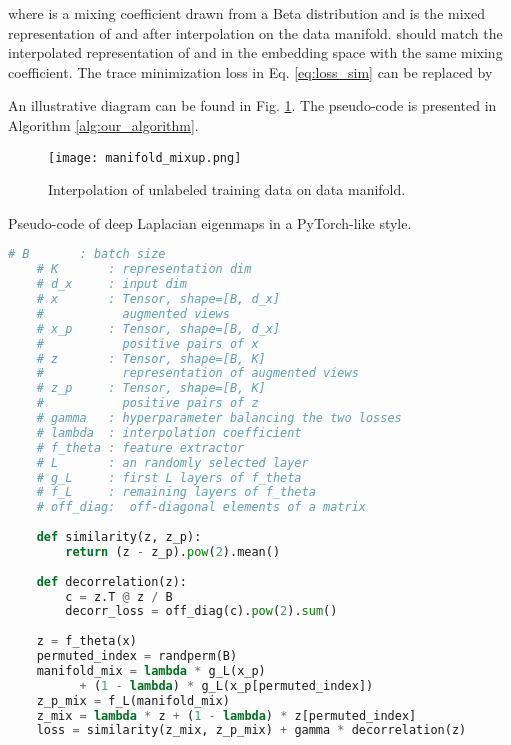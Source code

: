\documentclass{article}
\begin{document}
where  is a mixing coefficient drawn from a Beta distribution and  is the mixed representation of  and  after interpolation on the data manifold.  should match the interpolated representation of  and  in the embedding space with the same mixing coefficient. The trace minimization loss in Eq. \eqref{eq:loss_sim} can be replaced by 
 
An illustrative diagram can be found in Fig. \ref{fig:mixup}. The pseudo-code is presented in Algorithm \ref{alg:our_algorithm}.

\begin{figure}[h]
    \vskip 0.2in
    \begin{center}
    \centerline{\texttt{[image: manifold\_mixup.png]}}
    \caption{Interpolation of unlabeled training data on data manifold.}
    \label{fig:mixup}
    \end{center}
    \vskip -0.2in
  \end{figure}

\begin{algorithm}[H]
    \caption{Pseudo-code of deep Laplacian eigenmaps in a PyTorch-like style.}
    \label{alg:our_algorithm}
    
  \begin{lstlisting}[language=python]
    # B       : batch size 
    # K       : representation dim
    # d_x     : input dim
    # x       : Tensor, shape=[B, d_x]
    #           augmented views
    # x_p     : Tensor, shape=[B, d_x]
    #           positive pairs of x
    # z       : Tensor, shape=[B, K]
    #           representation of augmented views
    # z_p     : Tensor, shape=[B, K]
    #           positive pairs of z
    # gamma   : hyperparameter balancing the two losses
    # lambda  : interpolation coefficient
    # f_theta : feature extractor
    # L       : an randomly selected layer
    # g_L     : first L layers of f_theta
    # f_L     : remaining layers of f_theta
    # off_diag:  off-diagonal elements of a matrix
    
    def similarity(z, z_p):
        return (z - z_p).pow(2).mean()
    
    def decorrelation(z):
        c = z.T @ z / B
        decorr_loss = off_diag(c).pow(2).sum()
        
    z = f_theta(x)
    permuted_index = randperm(B)
    manifold_mix = lambda * g_L(x_p) 
          + (1 - lambda) * g_L(x_p[permuted_index])
    z_p_mix = f_L(manifold_mix)
    z_mix = lambda * z + (1 - lambda) * z[permuted_index]
    loss = similarity(z_mix, z_p_mix) + gamma * decorrelation(z)
  \end{lstlisting}
\end{algorithm}
\end{document}
